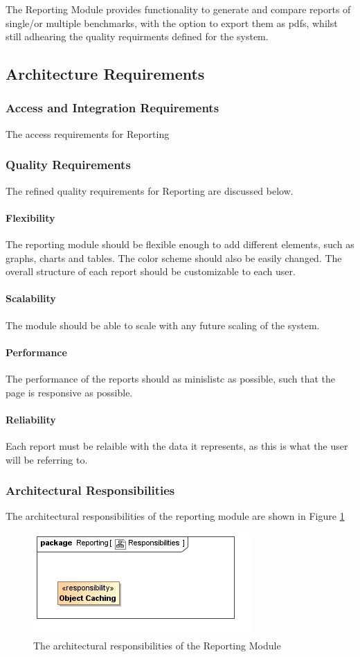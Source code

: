 The Reporting Module provides functionality to generate and compare reports
of single/or multiple benchmarks, with the option to export them as pdfs,
whilst still adhearing the quality requirments defined for the system.

\subsection{Architecture Requirements}
\subsubsection{Access and Integration Requirements}
The access requirements for Reporting
\subsubsection{Quality Requirements}
The refined quality requirements for Reporting are discussed below.
\paragraph{Flexibility}
The reporting module should be flexible enough to add different elements,
such as graphs, charts and tables. The color scheme should also be easily
changed. The overall structure of each report should be customizable to each user.
\paragraph{Scalability}
The module should be able to scale with any future scaling of the system.
\paragraph{Performance}
The performance of the reports should as minislistc as possible, such that the
page is responsive as possible.
\paragraph{Reliability}
Each report must be relaible with the data it represents, as this is what the
user will be referring to.
\subsubsection{Architectural Responsibilities}
The architectural responsibilities of the reporting module are shown in
Figure \ref{fig:reportingResponsibilities}
\begin{figure}[H]
	\begin{center}
	\includegraphics[scale=0.5]{../Diagrams and Charts/Reporting/Responsibilities.jpg}
	\caption{The architectural responsibilities of the Reporting Module}
	\label{fig:reportingResponsibilities}
	\end{center}
\end{figure}
